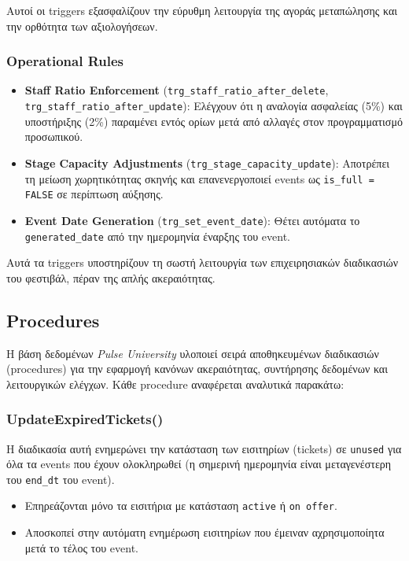 \documentclass[13pt]{extarticle}
\begin{document}
Αυτοί οι triggers εξασφαλίζουν την εύρυθμη λειτουργία της αγοράς μεταπώλησης και την ορθότητα των αξιολογήσεων.

\subsubsection{Operational Rules}

\begin{itemize}
    \item \textbf{Staff Ratio Enforcement} (\texttt{trg\_staff\_ratio\_after\_delete}, \texttt{trg\_staff\_ratio\_after\_update}): Ελέγχουν ότι η αναλογία ασφαλείας (5\%) και υποστήριξης (2\%) παραμένει εντός ορίων μετά από αλλαγές στον προγραμματισμό προσωπικού.
    \item \textbf{Stage Capacity Adjustments} (\texttt{trg\_stage\_capacity\_update}): Αποτρέπει τη μείωση χωρητικότητας σκηνής και επανενεργοποιεί events ως \texttt{is\_full = FALSE} σε περίπτωση αύξησης.
    \item \textbf{Event Date Generation} (\texttt{trg\_set\_event\_date}): Θέτει αυτόματα το \texttt{generated\_date} από την ημερομηνία έναρξης του event.
\end{itemize}

Αυτά τα triggers υποστηρίζουν τη σωστή λειτουργία των επιχειρησιακών διαδικασιών του φεστιβάλ, πέραν της απλής ακεραιότητας.

\subsection{Procedures}

Η βάση δεδομένων \textit{Pulse University} υλοποιεί σειρά αποθηκευμένων διαδικασιών (procedures) για την εφαρμογή κανόνων ακεραιότητας, συντήρησης δεδομένων και λειτουργικών ελέγχων. Κάθε procedure αναφέρεται αναλυτικά παρακάτω:

\subsubsection{UpdateExpiredTickets()}

Η διαδικασία αυτή ενημερώνει την κατάσταση των εισιτηρίων (tickets) σε \texttt{unused} για όλα τα events που έχουν ολοκληρωθεί (η σημερινή ημερομηνία είναι μεταγενέστερη του \texttt{end\_dt} του event). 
\begin{itemize}
    \item Επηρεάζονται μόνο τα εισιτήρια με κατάσταση \texttt{active} ή \texttt{on offer}.
    \item Αποσκοπεί στην αυτόματη ενημέρωση εισιτηρίων που έμειναν αχρησιμοποίητα μετά το τέλος του event.
\end{itemize}
\end{document}
